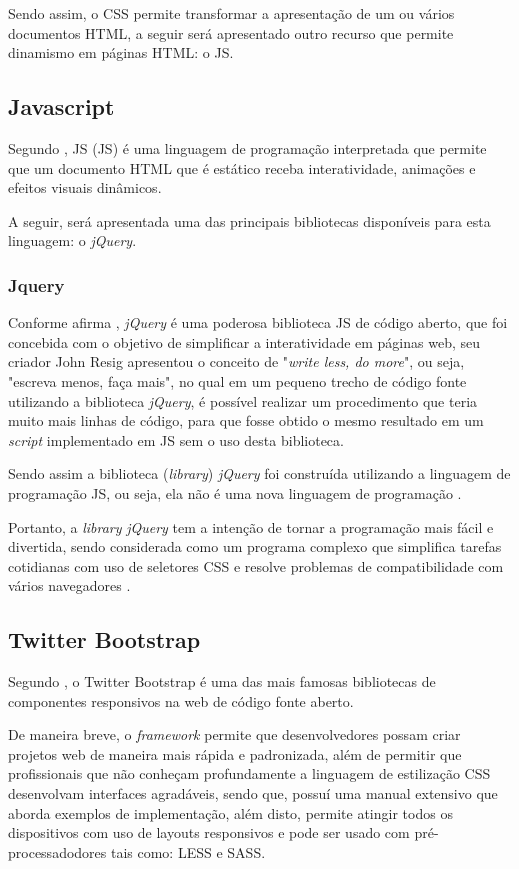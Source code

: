 Sendo assim, o \acs{CSS} permite transformar a apresentação de um ou vários
documentos \acs{HTML}, a seguir será apresentado outro recurso que permite
dinamismo em páginas \acs{HTML}: o \acl{JS}.

\subsection{Javascript}

Segundo , \acl{JS} (\acs{JS}) é
uma linguagem de programação interpretada que permite que um documento \acs{HTML} 
que é estático receba interatividade, animações e efeitos visuais dinâmicos.

A seguir, será apresentada uma das principais bibliotecas disponíveis  para esta
linguagem: o \textit{jQuery}.

\subsubsection{Jquery}

Conforme afirma , 
\textit{jQuery} é uma poderosa biblioteca \acl{JS} de código aberto, que foi
concebida com o objetivo de simplificar a interatividade em páginas web, seu 
criador John Resig apresentou o conceito de "\textit{write less, do more}", ou
seja, "escreva menos, faça mais", no qual em um pequeno trecho de código fonte 
utilizando a biblioteca \textit{jQuery}, é possível realizar um procedimento que
teria muito mais linhas de código, para que fosse obtido o mesmo resultado em um
\textit{script} implementado em \acs{JS} sem o uso desta biblioteca.

Sendo assim a biblioteca (\textit{library}) \textit{jQuery} foi construída
utilizando a linguagem de programação \acl{JS}, ou seja, ela não é uma nova 
linguagem de programação \cite{beginningJQuery}.

Portanto, a \textit{library} \textit{jQuery} tem a intenção de tornar a
programação mais fácil e divertida, sendo considerada como um programa complexo
que simplifica tarefas cotidianas com uso de seletores \acs{CSS} e resolve
problemas de compatibilidade com vários navegadores 
\cite{javascriptAndJQueryTheMissingManual}.

\subsection{Twitter Bootstrap}

Segundo \cite{jumpStartResponsiveWebDesign}, o \acs{Twitter Bootstrap}  é uma
das mais famosas bibliotecas de componentes responsivos na web de código fonte
aberto.

De maneira breve, o \textit{framework} permite que desenvolvedores possam criar
projetos web de maneira mais rápida e padronizada, além de permitir que
profissionais que não conheçam profundamente a linguagem de estilização 
\acs{CSS} desenvolvam interfaces agradáveis, sendo que, possuí uma manual 
extensivo que aborda exemplos de implementação, além disto, permite atingir
todos os dispositivos com uso de layouts responsivos e pode ser usado com
pré-processadodores tais como: \ac{LESS} e \ac{SASS}.

